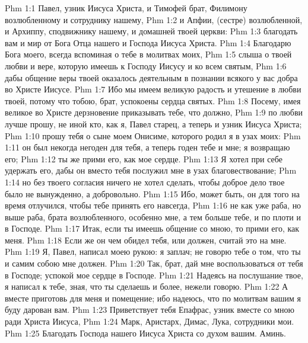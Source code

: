 \vs Phm 1:1 Павел, узник Иисуса Христа, и Тимофей брат, Филимону возлюбленному и сотруднику нашему,
\vs Phm 1:2 и Апфии, (сестре) возлюбленной, и Архиппу, сподвижнику нашему, и домашней твоей церкви:
\vs Phm 1:3 благодать вам и мир от Бога Отца нашего и Господа Иисуса Христа.
\rsbpar\vs Phm 1:4 Благодарю Бога моего, всегда вспоминая о тебе в молитвах моих,
\vs Phm 1:5 слыша о твоей любви и вере, которую имеешь к Господу Иисусу и ко всем святым,
\vs Phm 1:6 дабы общение веры твоей оказалось деятельным в познании всякого у вас добра во Христе Иисусе.
\vs Phm 1:7 Ибо мы имеем великую радость и утешение в любви твоей, потому что тобою, брат, успокоены сердца святых.
\rsbpar\vs Phm 1:8 Посему, имея великое во Христе дерзновение приказывать тебе, что должно,
\vs Phm 1:9 по любви лучше прошу, не иной кто, как я, Павел старец, а теперь и узник Иисуса Христа;
\vs Phm 1:10 прошу тебя о сыне моем Онисиме, которого родил я в узах моих:
\vs Phm 1:11 он был некогда негоден для тебя, а теперь годен тебе и мне; я возвращаю его;
\vs Phm 1:12 ты же прими его, как мое сердце.
\vs Phm 1:13 Я хотел при себе удержать его, дабы он вместо тебя послужил мне в узах  благовествование;
\vs Phm 1:14 но без твоего согласия ничего не хотел сделать, чтобы доброе дело твое было не вынужденно, а добровольно.
\vs Phm 1:15 Ибо, может быть, он для того на время отлучился, чтобы тебе принять его навсегда,
\vs Phm 1:16 не как уже раба, но выше раба, брата возлюбленного, особенно мне, а тем больше тебе, и по плоти и в Господе.
\vs Phm 1:17 Итак, если ты имеешь общение со мною, то прими его, как меня.
\vs Phm 1:18 Если же он чем обидел тебя, или должен, считай это на мне.
\vs Phm 1:19 Я, Павел, написал моею рукою: я заплач; не говорю тебе о том, что ты и самим собою мне должен.
\vs Phm 1:20 Так, брат, дай мне воспользоваться от тебя в Господе; успокой мое сердце в Господе.
\vs Phm 1:21 Надеясь на послушание твое, я написал к тебе, зная, что ты сделаешь и более, нежели говорю.
\vs Phm 1:22 А вместе приготовь для меня и помещение; ибо надеюсь, что по молитвам вашим я буду дарован вам.
\rsbpar\vs Phm 1:23 Приветствует тебя Епафрас, узник вместе со мною ради Христа Иисуса,
\vs Phm 1:24 Марк, Аристарх, Димас, Лука, сотрудники мои.
\rsbpar\vs Phm 1:25 Благодать Господа нашего Иисуса Христа со духом вашим. Аминь.
